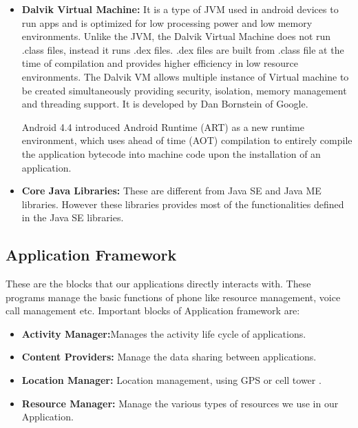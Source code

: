 \begin{itemize}

	\item \textbf{Dalvik Virtual Machine:}  It is a type of JVM used in android devices to run apps and is optimized for low processing power and low memory environments. Unlike the JVM, the Dalvik Virtual Machine does not run .class files, instead it runs .dex files. .dex files are built from .class file at the time of compilation and provides higher efficiency in low resource environments. The Dalvik VM allows multiple instance of Virtual machine to be created simultaneously providing security, isolation, memory management and threading support. It is developed by Dan Bornstein of Google. 

	Android 4.4 introduced Android Runtime (ART) as a new runtime environment, which uses ahead of time (AOT) compilation to entirely compile the application bytecode into machine code upon the installation of an application.

	

	\item \textbf{Core Java Libraries:} These are different from Java SE and Java ME libraries. However these libraries provides most of the functionalities defined in the Java SE libraries.

\end{itemize}

\subsection{Application Framework}

These are the blocks that our applications directly interacts with. These programs manage the basic functions of phone like resource management, voice call management etc.  Important blocks of Application framework are:

\begin{itemize}

\item \textbf{Activity Manager:}Manages the activity life cycle of applications.

\item \textbf{Content Providers:} Manage the data sharing between applications.

\item \textbf{Location Manager:} Location management, using GPS or cell tower .

\item \textbf{Resource Manager:} Manage the various types of resources we use in our Application.



\end{itemize}





